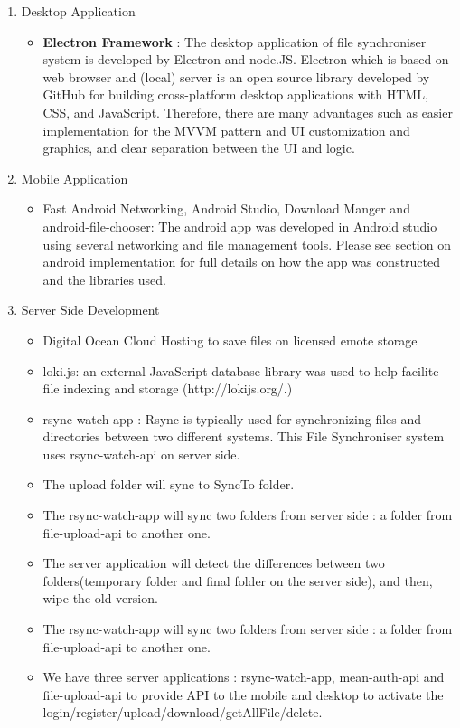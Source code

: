 \documentclass[11pt]{article}
\begin{document}
\begin{enumerate}
   \item Desktop Application
   \begin{itemize}
     \item \textbf{Electron Framework} : The desktop application of  file synchroniser system is developed by Electron and node.JS.  Electron which is based on web browser and (local) server is an open source library developed by GitHub for building cross-platform desktop applications with HTML, CSS, and JavaScript. Therefore, there are many advantages such as easier implementation for the MVVM pattern and UI customization and graphics, and clear separation between the UI and logic.
   \end{itemize}
   \item Mobile Application
   \begin{itemize}
     \item Fast Android Networking, Android Studio, Download Manger and android-file-chooser: The android app was developed in Android studio using several networking and file management tools. Please see section on android implementation for full details on how the app was constructed and the libraries used.
   \end{itemize}
   \item Server Side Development
   \begin{itemize}
     \item Digital Ocean Cloud Hosting to save files on licensed emote storage
     \item loki.js: an external JavaScript database library was used to help facilite file indexing and storage (http://lokijs.org/.)
     \item rsync-watch-app : Rsync is typically used for synchronizing files and directories between two different systems. This File Synchroniser system uses  rsync-watch-api on server side.
     \item The upload folder will sync to SyncTo folder.
     \item The rsync-watch-app will sync two folders from server side :  a folder from file-upload-api to another one. 
     \item The server application will detect the differences between two folders(temporary folder  and  final folder on the server side), and then, wipe the old version.
     \item The rsync-watch-app will sync two folders from server side :  a folder from file-upload-api to another one. 
     \item We have three server applications : rsync-watch-app, mean-auth-api  and  file-upload-api to provide API to the mobile and desktop to activate the login/register/upload/download/getAllFile/delete.

\end{itemize}
\end{enumerate}
\end{document}
